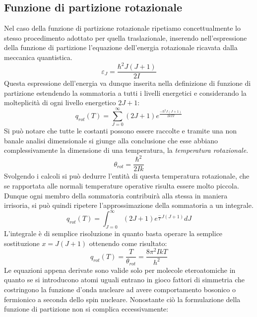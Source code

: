 \documentclass[oneside]{amsbook}
\numberwithin{section}{chapter}
\numberwithin{equation}{section}
\numberwithin{figure}{section}
\begin{document}
\subsection{Funzione di partizione rotazionale}
Nel caso della funzione di partizione rotazionale ripetiamo concettualmente lo stesso procedimento adottato per quella traslazionale, inserendo nell'espressione della funzione di partizione l'equazione dell'energia rotazionale ricavata dalla meccanica quantistica.
\begin{equation}
\varepsilon_{J}=\frac{\hbar^2J(J+1)}{2I}
\end{equation}
Questa espressione dell'energia va dunque inserita nella definizione di funzione di partizione estendendo la sommatoria a tutti i livelli energetici e considerando la molteplicità di ogni livello energetico $2J+1$:
\begin{equation}
q_{rot}(T)=\sum_{J=0}^\infty(2J+1)e^\frac{-\hbar^2J(J+1)}{2kTI}
\end{equation}
Si può notare che tutte le costanti possono essere raccolte e tramite una non banale analisi dimensionale si giunge alla conclusione che esse abbiano complessivamente la dimensione di una temperatura, la \emph{temperatura rotazionale}. 
\begin{equation}
\theta_{rot}=\frac{\hbar^2}{2Ik}
\end{equation}
Svolgendo i calcoli si può dedurre l'entità di questa temperatura rotazionale, che se rapportata alle normali temperature operative risulta essere molto piccola. Dunque ogni membro della sommatoria contribuirà alla stessa in maniera irrisoria, si può quindi ripetere l'approssimazione della sommatoria a un integrale.
\begin{equation}
q_{rot}(T)=\int_{J=0}^\infty(2J+1)e^{\frac{-}{T}J(J+1)}dJ
\end{equation}
L'integrale è di semplice risoluzione in quanto basta operare la semplice sostituzione $x=J(J+1)$ ottenendo come risultato:
\begin{equation}
q_{rot}(T)=\frac{T}{\theta_{rot}}=\frac{8\pi^2IkT}{h^2}
\end{equation}
Le equazioni appena derivate sono valide solo per molecole eteroatomiche in quanto se si introducono atomi uguali entrano in gioco fattori di simmetria che costringono la funzione d'onda nucleare ad avere comportamento bosonico o fermionico a seconda dello spin nucleare. Nonostante ciò la formulazione della funzione di partizione non si complica eccessivamente:
\end{document}

